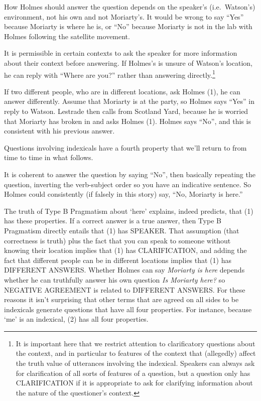 \documentclass[
  10pt,
  letterpaper,
  DIV=11,
  numbers=noendperiod,
  twoside]{scrartcl}
\providecommand{\tightlist}{%
  \setlength{\itemsep}{0pt}\setlength{\parskip}{0pt}}\usepackage{longtable,booktabs,array}
\begin{document}
\begin{description}
\tightlist
\item[SPEAKER]
How Holmes should answer the question depends on the speaker's
(i.e.~Watson's) environment, not his own and not Moriarty's. It would be
wrong to say ``Yes'' because Moriarty is where he is, or ``No'' because
Moriarty is not in the lab with Holmes following the satellite movement.
\item[CLARIFICATION]
It is permissible in certain contexts to ask the speaker for more
information about their context before answering. If Holmes's is unsure
of Watson's location, he can reply with ``Where are you?'' rather than
answering directly.\footnote{It is important here that we restrict
  attention to clarificatory questions about the context, and in
  particular to features of the context that (allegedly) affect the
  truth value of utterances involving the indexical. Speakers can always
  ask for clarification of all sorts of features of a question, but a
  question only has CLARIFICATION if it is appropriate to ask for
  clarifying information about the nature of the questioner's context.}
\item[DIFFERENT ANSWERS]
If two different people, who are in different locations, ask Holmes (1),
he can answer differently. Assume that Moriarty is at the party, so
Holmes says ``Yes'' in reply to Watson. Lestrade then calls from
Scotland Yard, because he is worried that Moriarty has broken in and
asks Holmes (1). Holmes says ``No'', and this is consistent with his
previous answer.
\end{description}

Questions involving indexicals have a fourth property that we'll return
to from time to time in what follows.

\begin{description}
\tightlist
\item[NEGATIVE AGREEMENT]
It is coherent to answer the question by saying ``No'', then basically
repeating the question, inverting the verb-subject order so you have an
indicative sentence. So Holmes could consistently (if falsely in this
story) say, ``No, Moriarty is here.''
\end{description}

The truth of Type B Pragmatism about `here' explains, indeed predicts,
that (1) has these properties. If a correct answer is a true answer,
then Type B Pragmatism directly entails that (1) has SPEAKER. That
assumption (that correctness is truth) plus the fact that you can speak
to someone without knowing their location implies that (1) has
CLARIFICATION, and adding the fact that different people can be in
different locations implies that (1) has DIFFERENT ANSWERS. Whether
Holmes can say \emph{Moriarty is here} depends whether he can truthfully
answer his own question \emph{Is Moriarty here?} so NEGATIVE AGREEMENT
is related to DIFFERENT ANSWERS. For these reasons it isn't surprising
that other terms that are agreed on all sides to be indexicals generate
questions that have all four properties. For instance, because `me' is
an indexical, (2) has all four properties.
\end{document}
